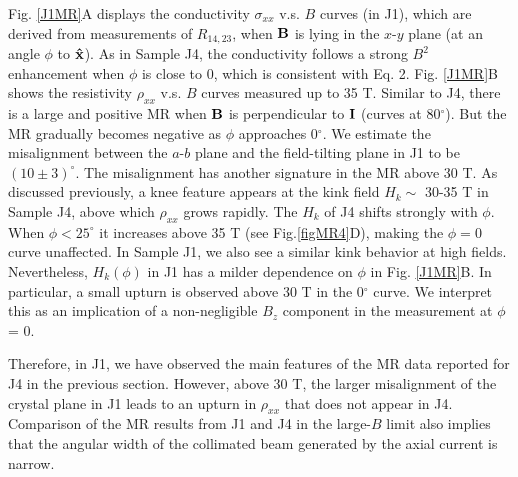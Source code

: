 Fig. \ref{J1MR}A displays the conductivity $\sigma_{xx}$ v.s. $B$ curves (in J1), which are derived from measurements of $R_{14,23}$, when $\bf B$ is lying in the $x$-$y$ plane (at an angle $\phi$ to $\bf\hat{x}$). As in Sample J4, the conductivity follows a strong $B^2$ enhancement when $\phi$ is close to 0, which is consistent with Eq. 2. Fig. \ref{J1MR}B shows the resistivity $\rho_{xx}$ v.s. $B$ curves measured up to 35 T. Similar to J4, there is a large and positive MR when $\bf B$ is perpendicular to $\bf I$ (curves at 80$^\circ$). But the MR gradually becomes negative as $\phi$ approaches 0$^\circ$. We estimate the misalignment between the $a$-$b$ plane and the field-tilting plane in J1 to be $(10\pm 3)^\circ$. The misalignment has another signature in the MR above 30 T. As discussed previously, a knee feature appears at the kink field $H_k\sim$ 30-35 T in Sample J4, above which $\rho_{xx}$ grows rapidly. The $H_k$ of J4 shifts strongly with $\phi$. When $\phi < 25^\circ$ it increases above 35 T (see Fig.\ref{figMR4}D), making the $\phi=0$ curve unaffected. In Sample J1, we also see a similar kink behavior at high fields. Nevertheless, $H_k(\phi)$ in J1 has a milder dependence on $\phi$ in Fig. \ref{J1MR}B. In particular, a small upturn is observed above 30 T in the 0$^\circ$ curve. We interpret this as an implication of a non-negligible $B_z$ component in the measurement at $\phi$ = 0. 

Therefore, in J1, we have observed the main features of the MR data reported for J4 in the previous section. However, above 30 T, the larger misalignment of the crystal plane in J1 leads to an upturn in $\rho_{xx}$ that does not appear in J4. Comparison of the MR results from J1 and J4 in the large-$B$ limit also implies that the angular width of the collimated beam generated by the axial current is narrow. 





